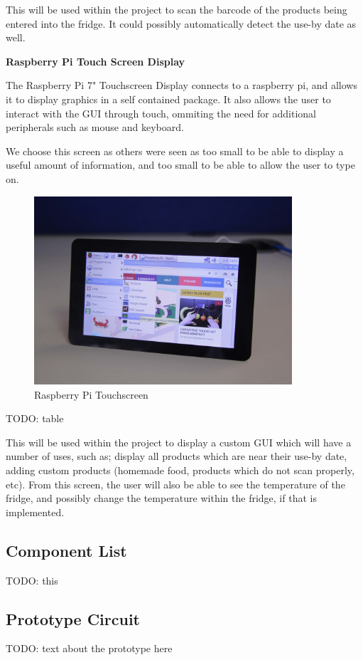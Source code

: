\documentclass[10pt]{article}
\begin{document}
This will be used within the project to scan the barcode of the products being entered into the fridge. It could possibly automatically detect the use-by date as well.

\textbf{Raspberry Pi Touch Screen Display}

The Raspberry Pi 7" Touchscreen Display connects to a raspberry pi, and allows it to display graphics in a self contained package. It also allows the user to interact with the GUI through touch, ommiting the need for additional peripherals such as mouse and keyboard.

We choose this screen as others were seen as too small to be able to display a useful amount of information, and too small to be able to allow the user to type on.

\begin{figure}[h]
\centering
\caption{Raspberry Pi Touchscreen}
\label{Raspberry Pi Touchscreen}
\includegraphics[height=7cm]{images/pi-touchscreen.jpg}
\end{figure}

TODO: table

This will be used within the project to display a custom GUI which will have a number of uses, such as; display all products which are near their use-by date, adding custom products (homemade food, products which do not scan properly, etc). From this screen, the user will also be able to see the temperature of the fridge, and possibly change the temperature within the fridge, if that is implemented.

\subsection{Component List}
TODO: this

\newpage
\subsection{Prototype Circuit}
TODO: text about the prototype here
\end{document}
